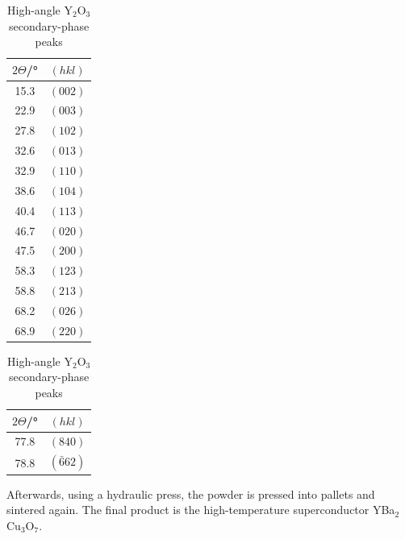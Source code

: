 \documentclass[12pt, a4paper]{article}
\begin{document}
\begin{table}[H]
	\centering
	\begin{minipage}{0.45\textwidth}
		\centering
		\begin{tabular}{cc}
			\toprule
			$2\Theta$/°  & $(hkl)$ \\
			\midrule
			15.3          & $(002)$ \\
			22.9          & $(003)$ \\
			27.8          & $(102)$ \\
			32.6          & $(013)$ \\
			32.9          & $(110)$ \\
			38.6          & $(104)$ \\
			40.4          & $(113)$ \\
			46.7          & $(020)$ \\
			47.5          & $(200)$ \\
			58.3          & $(123)$ \\
			58.8          & $(213)$ \\
			68.2          & $(026)$ \\
			68.9          & $(220)$ \\
			\bottomrule
		\end{tabular}
		\caption{Standard diffraction peaks for orthorhombic YBa$_2$Cu$_3$O$_7$}\label{tab:ybacuo}
	\end{minipage}
	\hfill
	\begin{minipage}{0.45\textwidth}
		\centering
		\begin{tabular}{cc}
			\toprule
			$2\Theta$/° & $(hkl)$       \\
			\midrule
			77.8          & $(840)$       \\
			78.8          & $(\bar{6}62)$ \\
			\bottomrule
		\end{tabular}
		\caption{High-angle Y$_2$O$_3$ secondary-phase peaks}\label{tab:highyo}
	\end{minipage}
\end{table}
Afterwards, using a hydraulic press, the powder is pressed into pallets and sintered again. The final product is the high-temperature superconductor YBa$_2$Cu$_3$O$_7$.
\end{document}
